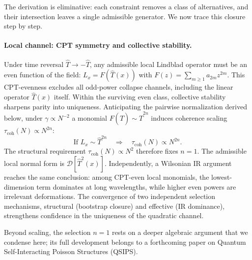 \documentclass[12pt,a4paper]{article}
\numberwithin{equation}{section}
\begin{document}
\noindent The derivation is eliminative: each constraint removes a class of alternatives, and their intersection leaves a single admissible generator. We now trace this closure step by step.

\paragraph{Local channel: CPT symmetry and collective stability.}
Under time reversal $\hat T \to -\hat T$, any admissible local Lindblad operator must be an even function of the field: $L_x = F(\hat T(x))$ with $F(z) = \sum_{m \ge 1} a_{2m} z^{2m}$. This CPT-evenness excludes all odd-power collapse channels, including the linear operator $\hat T(x)$ itself. Within the surviving even class, collective stability sharpens parity into uniqueness. Anticipating the pairwise normalization derived below, under $\gamma \propto N^{-2}$ a monomial $F(\hat T) \sim \hat T^{2n}$ induces coherence scaling $\tau_{\mathrm{coh}}(N) \propto N^{2n}$:
\begin{equation}
\text{If } L_x \sim \hat{T}^{2n} \quad\Rightarrow\quad
\tau_{\mathrm{coh}}(N)\propto N^{2n}.
\label{eq:scaling-condition}
\end{equation}
The structural requirement $\tau_{\mathrm{coh}}(N) \propto N^2$ therefore fixes $n = 1$. The admissible local normal form is $\mathcal{D}[\hat T^2(x)]$. Independently, a Wilsonian IR argument reaches the same conclusion: among CPT-even local monomials, the lowest-dimension term dominates at long wavelengths, while higher even powers are irrelevant deformations. The convergence of two independent selection mechanisms, structural (bootstrap closure) and effective (IR dominance), strengthens confidence in the uniqueness of the quadratic channel.

Beyond scaling, the selection $n = 1$ rests on a deeper algebraic argument that we condense here; its full development belongs to a forthcoming paper on Quantum Self-Interacting Poisson Structures (QSIPS).
\end{document}
